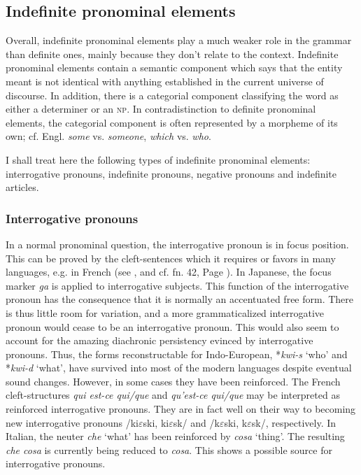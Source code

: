 \subsection{Indefinite pronominal elements}

Overall, indefinite pronominal elements play a much weaker role in the grammar than definite ones, mainly because they don't relate to the context. Indefinite pronominal elements contain a semantic component which says that the entity meant is not identical with anything established in the current universe of discourse. In addition, there is a categorial component classifying the word as either a determiner or an \textsc{np}. In contradistinction to definite pronominal elements, the categorial component is often represented by a morpheme of its own; cf. Engl. \textit{some} vs. \textit{someone}, \textit{which} vs. \textit{who}.

I shall treat here the following types of indefinite pronominal elements: interrogative pronouns, indefinite pronouns, negative pronouns and indefinite articles.

\subsubsection{Interrogative pronouns}
In a normal pronominal question, the interrogative pronoun is in focus position. This can be proved by the cleft-sentences which it requires or favors in many languages, e.g. in French (see \citealt{Sasse1977b}, and cf. fn. 42, Page \pageref{page125}\chk%
). In Japanese, the focus marker \textit{ga} is applied to interrogative subjects. This function of the interrogative pronoun has the consequence that it is normally an accentuated free form. There is thus little room for variation, and a more grammaticalized interrogative pronoun would cease to be an interrogative pronoun. This would also seem to account for the amazing diachronic persistency evinced by interrogative pronouns. Thus, the forms reconstructable for Indo-European, *\textit{kwi-s} ‘who’ and *\textit{kwi-d} ‘what’, have survived into most of the modern languages despite eventual sound changes. However, in some cases they have been reinforced. The French cleft-structures \textit{qui est-ce qui/que} and \textit{qu'est-ce qui/que} may be interpreted as reinforced interrogative pronouns. They are in fact well on their way to becoming new interrogative pronouns /ki$\varepsilon $ski, ki$\varepsilon $sk/ and /k$\varepsilon $ski, k$\varepsilon $sk/, respectively. In Italian, the neuter \textit{che} ‘what’ has been reinforced by \textit{cosa} ‘thing’. The resulting \textit{che cosa} is currently being reduced to \textit{cosa}. This shows a possible source for interrogative pronouns.

